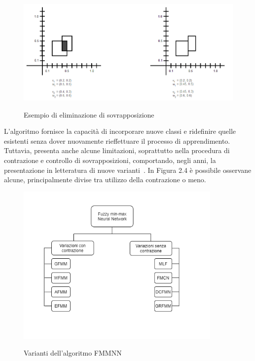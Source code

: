 \documentclass[11pt,  oneside, openany]{book}
\begin{document}
\begin{figure}[h!]
\begin{center}
  \includegraphics[width=12cm]{Immagini/elimination_overlap.png}\\
  \caption{Esempio di eliminazione di sovrapposizione}
\end{center}
\end{figure}


L'algoritmo fornisce la capacità di incorporare nuove classi e ridefinire quelle esistenti senza dover nuovamente rieffettuare il processo di apprendimento. Tuttavia, presenta anche alcune limitazioni, soprattutto nella procedura di contrazione e controllo di sovrapposizioni, comportando, negli anni, la presentazione in letteratura di nuove varianti~\cite{fmmnn_variants}. In Figura 2.4 è possibile osservane alcune, principalmente divise tra utilizzo della contrazione o meno. 

\begin{figure}[h!]
\begin{center}
  \includegraphics[width=10cm]{Immagini/varianti_FMMNN.png}\\
  \caption{Varianti dell'algoritmo FMMNN}
\end{center}
\end{figure}
\end{document}
